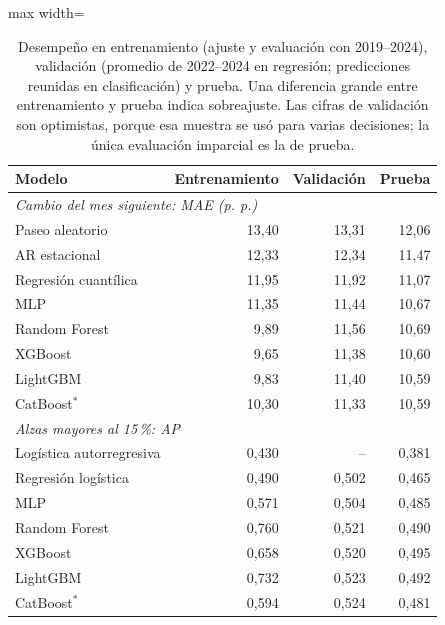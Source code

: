 \begin{table}[htbp]\centering\small
\caption{Desempeño en entrenamiento (ajuste y evaluación con 2019--2024), validación (promedio de 2022--2024 en regresión; predicciones reunidas en clasificación) y prueba. Una diferencia grande entre entrenamiento y prueba indica sobreajuste. Las cifras de validación son optimistas, porque esa muestra se usó para varias decisiones; la única evaluación imparcial es la de prueba.}\label{tab:entrenamiento}
\begin{adjustbox}{max width=\textwidth}\begin{tabular}{lrrr}\toprule
Modelo & Entrenamiento & Validación & Prueba\\ \midrule
\multicolumn{4}{l}{\emph{Cambio del mes siguiente: MAE (p. p.)}}\\
Paseo aleatorio & 13{,}40 & 13{,}31 & 12{,}06 \\
AR estacional & 12{,}33 & 12{,}34 & 11{,}47 \\
Regresión cuantílica & 11{,}95 & 11{,}92 & 11{,}07 \\
MLP & 11{,}35 & 11{,}44 & 10{,}67 \\
Random Forest & 9{,}89 & 11{,}56 & 10{,}69 \\
XGBoost & 9{,}65 & 11{,}38 & 10{,}60 \\
LightGBM & 9{,}83 & 11{,}40 & 10{,}59 \\
CatBoost$^\ast$ & 10{,}30 & 11{,}33 & 10{,}59 \\
\midrule
\multicolumn{4}{l}{\emph{Alzas mayores al 15\,\%: AP}}\\
Logística autorregresiva & 0{,}430 & -- & 0{,}381 \\
Regresión logística & 0{,}490 & 0{,}502 & 0{,}465 \\
MLP & 0{,}571 & 0{,}504 & 0{,}485 \\
Random Forest & 0{,}760 & 0{,}521 & 0{,}490 \\
XGBoost & 0{,}658 & 0{,}520 & 0{,}495 \\
LightGBM & 0{,}732 & 0{,}523 & 0{,}492 \\
CatBoost$^\ast$ & 0{,}594 & 0{,}524 & 0{,}481 \\
\bottomrule\end{tabular}\end{adjustbox}\end{table}
